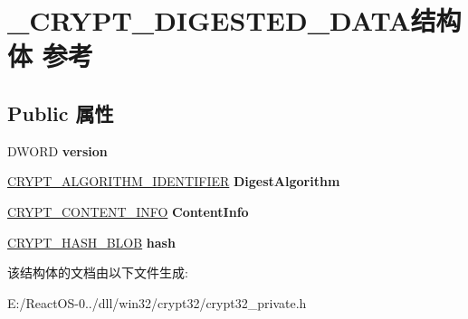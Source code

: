 \hypertarget{struct___c_r_y_p_t___d_i_g_e_s_t_e_d___d_a_t_a}{}\section{\+\_\+\+C\+R\+Y\+P\+T\+\_\+\+D\+I\+G\+E\+S\+T\+E\+D\+\_\+\+D\+A\+T\+A结构体 参考}
\label{struct___c_r_y_p_t___d_i_g_e_s_t_e_d___d_a_t_a}
\subsection*{Public 属性}
\begin{DoxyCompactItemize}
\item 
\mbox{\label{struct___c_r_y_p_t___d_i_g_e_s_t_e_d___d_a_t_a_a77bd1db1ff55e7ecbabe7e37ad07ec41}} 
D\+W\+O\+RD {\bfseries version}
\item 
\mbox{\label{struct___c_r_y_p_t___d_i_g_e_s_t_e_d___d_a_t_a_aaa45f97fcb88222e31f313d3ec1a5711}} 
\hyperlink{struct___c_r_y_p_t___a_l_g_o_r_i_t_h_m___i_d_e_n_t_i_f_i_e_r}{C\+R\+Y\+P\+T\+\_\+\+A\+L\+G\+O\+R\+I\+T\+H\+M\+\_\+\+I\+D\+E\+N\+T\+I\+F\+I\+ER} {\bfseries Digest\+Algorithm}
\item 
\mbox{\label{struct___c_r_y_p_t___d_i_g_e_s_t_e_d___d_a_t_a_a6750efb2ac1fe3579c4224a1c949e146}} 
\hyperlink{struct___c_r_y_p_t___c_o_n_t_e_n_t___i_n_f_o}{C\+R\+Y\+P\+T\+\_\+\+C\+O\+N\+T\+E\+N\+T\+\_\+\+I\+N\+FO} {\bfseries Content\+Info}
\item 
\mbox{\label{struct___c_r_y_p_t___d_i_g_e_s_t_e_d___d_a_t_a_aebd1712b958161998b36f33c9554a603}} 
\hyperlink{struct___c_r_y_p_t_o_a_p_i___b_l_o_b}{C\+R\+Y\+P\+T\+\_\+\+H\+A\+S\+H\+\_\+\+B\+L\+OB} {\bfseries hash}
\end{DoxyCompactItemize}


该结构体的文档由以下文件生成\+:\begin{DoxyCompactItemize}
\item 
E\+:/\+React\+O\+S-\/0../dll/win32/crypt32/crypt32\+\_\+private.\+h\end{DoxyCompactItemize}
